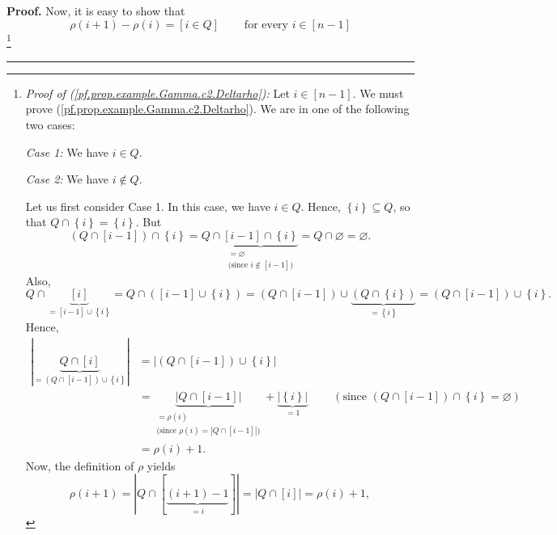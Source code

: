 \documentclass[numbers=enddot,12pt,final,onecolumn,notitlepage,abstracton]{scrartcl}
\theoremstyle{definition}
\newenvironment{proof}[1][Proof]{\noindent\textbf{#1.} }{\ \rule{0.5em}{0.5em}}
\newenvironment{verlong}{}{}
\begin{document}
\begin{verlong}
\begin{footnotesize}
\begin{proof}
Now, it is easy to show that%
\begin{equation}
\rho\left(  i+1\right)  -\rho\left(  i\right)  =\left[  i\in Q\right]
\ \ \ \ \ \ \ \ \ \ \text{for every }i\in\left[  n-1\right]
\label{pf.prop.example.Gamma.c2.Deltarho}%
\end{equation}
\footnote{\textit{Proof of (\ref{pf.prop.example.Gamma.c2.Deltarho}):} Let
$i\in\left[  n-1\right]  $. We must prove
(\ref{pf.prop.example.Gamma.c2.Deltarho}). We are in one of the following two
cases:
\par
\textit{Case 1:} We have $i\in Q$.
\par
\textit{Case 2:} We have $i\notin Q$.
\par
Let us first consider Case 1. In this case, we have $i\in Q$. Hence, $\left\{
i\right\}  \subseteq Q$, so that $Q\cap\left\{  i\right\}  =\left\{
i\right\}  $. But%
\[
\left(  Q\cap\left[  i-1\right]  \right)  \cap\left\{  i\right\}
=Q\cap\underbrace{\left[  i-1\right]  \cap\left\{  i\right\}  }%
_{\substack{=\varnothing\\\text{(since }i\notin\left[  i-1\right]  \text{)}%
}}=Q\cap\varnothing=\varnothing.
\]
Also,%
\[
Q\cap\underbrace{\left[  i\right]  }_{=\left[  i-1\right]  \cup\left\{
i\right\}  }=Q\cap\left(  \left[  i-1\right]  \cup\left\{  i\right\}  \right)
=\left(  Q\cap\left[  i-1\right]  \right)  \cup\underbrace{\left(
Q\cap\left\{  i\right\}  \right)  }_{=\left\{  i\right\}  }=\left(
Q\cap\left[  i-1\right]  \right)  \cup\left\{  i\right\}  .
\]
Hence,%
\begin{align*}
\left\vert \underbrace{Q\cap\left[  i\right]  }_{=\left(  Q\cap\left[
i-1\right]  \right)  \cup\left\{  i\right\}  }\right\vert  &  =\left\vert
\left(  Q\cap\left[  i-1\right]  \right)  \cup\left\{  i\right\}  \right\vert
\\
&  =\underbrace{\left\vert Q\cap\left[  i-1\right]  \right\vert }%
_{\substack{=\rho\left(  i\right)  \\\text{(since }\rho\left(  i\right)
=\left\vert Q\cap\left[  i-1\right]  \right\vert \text{)}}%
}+\underbrace{\left\vert \left\{  i\right\}  \right\vert }_{=1}%
\ \ \ \ \ \ \ \ \ \ \left(  \text{since }\left(  Q\cap\left[  i-1\right]
\right)  \cap\left\{  i\right\}  =\varnothing\right) \\
&  =\rho\left(  i\right)  +1.
\end{align*}
Now, the definition of $\rho$ yields%
\[
\rho\left(  i+1\right)  =\left\vert Q\cap\left[  \underbrace{\left(
i+1\right)  -1}_{=i}\right]  \right\vert =\left\vert Q\cap\left[  i\right]
\right\vert =\rho\left(  i\right)  +1,
\]}
\end{proof}
\end{footnotesize}
\end{verlong}
\end{document}
